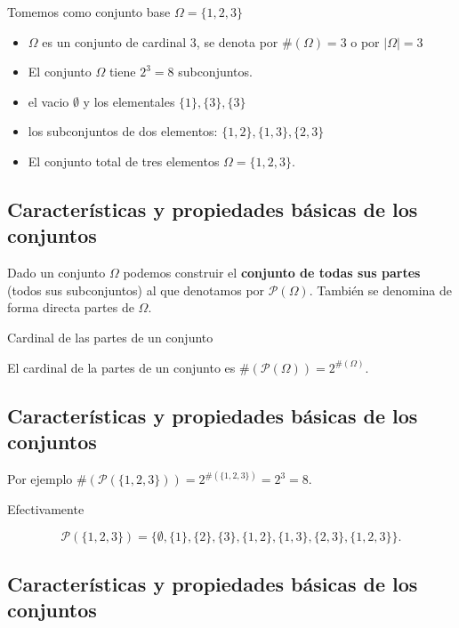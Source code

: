 \documentclass[]{book}
\providecommand{\tightlist}{%
  \setlength{\itemsep}{0pt}\setlength{\parskip}{0pt}}
\begin{document}
Tomemos como conjunto base \(\Omega=\{1,2,3\}\)

\begin{itemize}
\tightlist
\item
  \(\Omega\) es un conjunto de cardinal 3, se denota por \(\#(\Omega)=3\) o por \(|\Omega|=3\)
\item
  El conjunto \(\Omega\) tiene \(2^3=8\) subconjuntos.
\item
  el vacio \(\emptyset\) y los elementales \(\{1\},\{3\},\{3\}\)
\item
  los subconjuntos de dos elementos: \(\{1,2\},\{1,3\},\{2,3\}\)
\item
  El conjunto total de tres elementos \(\Omega=\{1,2,3\}.\)
\end{itemize}

\hypertarget{caracteruxedsticas-y-propiedades-buxe1sicas-de-los-conjuntos-3}{%
\subsection{Características y propiedades básicas de los conjuntos}\label{caracteruxedsticas-y-propiedades-buxe1sicas-de-los-conjuntos-3}}

Dado un conjunto \(\Omega\) podemos construir el \textbf{conjunto de todas sus partes} (todos sus subconjuntos) al que denotamos por \(\mathcal{P}(\Omega)\). También se denomina de forma directa partes de \(\Omega\).

 Cardinal de las partes de un conjunto

El cardinal de la partes de un conjunto es \(\#(\mathcal{P}(\Omega))=2^{\#(\Omega)}.\)

\hypertarget{caracteruxedsticas-y-propiedades-buxe1sicas-de-los-conjuntos-4}{%
\subsection{Características y propiedades básicas de los conjuntos}\label{caracteruxedsticas-y-propiedades-buxe1sicas-de-los-conjuntos-4}}

Por ejemplo \(\#\left(\mathcal{P}(\{1,2,3\})\right)=2^{\#(\{1,2,3\})}=2^3=8.\)

Efectivamente

\[\mathcal{P}(\{1,2,3\})=\{\emptyset,\{1\},\{2\},\{3\},\{1,2\},\{1,3\},\{2,3\},\{1,2,3\}\}.\]

\hypertarget{caracteruxedsticas-y-propiedades-buxe1sicas-de-los-conjuntos-5}{%
\subsection{Características y propiedades básicas de los conjuntos}\label{caracteruxedsticas-y-propiedades-buxe1sicas-de-los-conjuntos-5}}
\end{document}
